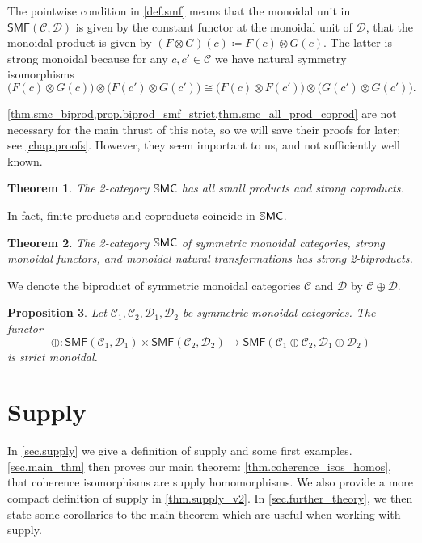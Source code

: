 \documentclass[11pt, oneside, article]{memoir}
\theoremstyle{plain}
\newtheorem{theorem}{Theorem}[chapter]
\newtheorem{proposition}[theorem]{Proposition}
\theoremstyle{definition}
\theoremstyle{remark}
\newcommand{\cat}[1]{\mathcal{#1}}%
\newcommand{\Cat}[1]{{\mathsf{#1}}}%
\newcommand{\CCat}[1]{\mathbb{\StrLeft{#1}{1}}\Cat{\StrGobbleLeft{#1}{1}}}%
\newcommand{\smf}{\Cat{SMF}}
\newcommand{\ssmc}{\CCat{SMC}}
\begin{document}
The pointwise condition in \cref{def.smf} means that the monoidal unit in $\smf(\cat{C},\cat{D})$ is given by the constant functor at the monoidal unit of $\cat{D}$, that the monoidal product is given by $(F\otimes G)(c)\coloneqq F(c)\otimes G(c).$ The latter is strong monoidal because for any $c,c'\in\cat{C}$ we have natural symmetry isomorphisms
\[
	\big(F(c)\otimes G(c)\big)\otimes\big(F(c')\otimes G(c')\big)
	\cong
	\big(F(c)\otimes F(c')\big)\otimes\big(G(c')\otimes G(c')\big).
\]

\cref{thm.smc_biprod,prop.biprod_smf_strict,thm.smc_all_prod_coprod} are not necessary for the main thrust of this note, so we will save their proofs for later; see \cref{chap.proofs}. %
However, they seem important to us, and not sufficiently well known. 

\begin{theorem}\label{thm.smc_all_prod_coprod}
The 2-category $\ssmc$ has all small products and strong coproducts.
\end{theorem}

In fact, finite products and coproducts coincide in $\ssmc$.

\begin{theorem}\label{thm.smc_biprod}
The 2-category $\ssmc$ of symmetric monoidal categories, strong monoidal functors, and monoidal natural transformations has strong 2-biproducts.
\end{theorem}

We denote the biproduct of symmetric monoidal categories $\cat{C}$ and $\cat{D}$ by $\cat{C}\oplus\cat{D}$.

\begin{proposition}\label{prop.biprod_smf_strict}
Let $\cat{C}_1,\cat{C}_2,\cat{D}_1,\cat{D}_2$ be symmetric monoidal categories. The functor
\[
  \oplus\colon
  \smf(\cat{C}_1,\cat{D}_1)\times\smf(\cat{C}_2,\cat{D}_2)
  \to
  \smf(\cat{C}_1\oplus\cat{C}_2,\cat{D}_1\oplus\cat{D}_2)
\]
is strict monoidal.
\end{proposition}

\chapter{Supply}

In \cref{sec.supply} we give a definition of supply and some first examples. \cref{sec.main_thm} then proves our main theorem: \cref{thm.coherence_isos_homos}, that coherence isomorphisms are supply homomorphisms. We also provide a more compact definition of supply in \cref{thm.supply_v2}. In \cref{sec.further_theory}, we then state some corollaries to the main theorem which are useful when working with supply. 
\end{document}
